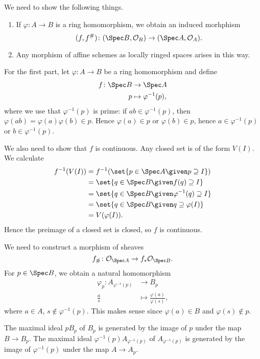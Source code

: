 We need to show the following things.
\begin{enumerate}
	\item If $\varphi\colon A\to B$ is a ring homomorphism, we obtain an
		induced morhphism
		\[ (f, f^\#)\colon (\Spec B, \mathcal{O}_B)\to (\Spec A, \mathcal{O}_A). \]
	\item Any morphism of affine schemes as locally ringed spaces arises in
		this way.
\end{enumerate}

For the first part, let $\varphi\colon A\to B$ be a ring homomorphism and define
\begin{align*}
	f\colon \Spec B&\to \Spec A\\
	p&\mapsto \varphi^{-1}(p),
\end{align*}
where we use that $\varphi^{-1}(p)$ is prime: if $ab \in \varphi^{-1}(p)$, then
$\varphi(ab) = \varphi(a)\varphi(b) \in p$. Hence $\varphi(a) \in p$ or
$\varphi(b) \in p$, hence $a \in \varphi^{-1}(p)$ or $b \in \varphi^{-1}(p)$.

We also need to show that $f$ is continuous. Any closed set is of the form
$V(I)$. We calculate
\begin{align*}
	f^{-1}(V(I)) &= f^{-1}(\set{p \in \Spec A\given p\supseteq I})\\
	&= \set{q \in \Spec B\given f(q) \supseteq I}\\
	&= \set{q \in \Spec B\given \varphi^{-1}(q)\supseteq I}\\
	&= \set{q \in \Spec B\given q\supseteq \varphi(I)}\\
	&= V(\varphi(I)).
\end{align*}
Hence the preimage of a closed set is closed, so $f$ is continuous.

We need to construct a morphism of sheaves
\[ f_\#\colon \mathcal{O}_{\Spec A} \to f_*\mathcal{O}_{\Spec B}. \]
For $p \in \Spec B$, we obtain a natural homomorphism
\begin{align*}
	\varphi_p\colon A_{\varphi^{-1}(p)}&\to B_p\\
	\frac{a}{s}&\mapsto \frac{\varphi(a)}{\varphi(s)},
\end{align*}
where $a \in A$, $s\notin \varphi^{-1}(p)$. This makes sense since $\varphi(a) \in B$
and $\varphi(s)\notin p$.

The maximal ideal $pB_p$ of $B_p$ is generated by the image of $p$ under the map
$B\to B_p$. The maximal ideal $\varphi^{-1}(p)A_{\varphi^{-1}(p)}$ of $A_{\varphi^{-1}(p)}$ is generated by the image
of $\varphi^{-1}(p)$ under the map $A\to A_p$.

